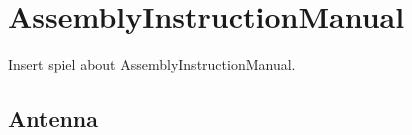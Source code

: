 

\section{AssemblyInstructionManual}

Insert spiel about AssemblyInstructionManual.

\subsection{Antenna}

